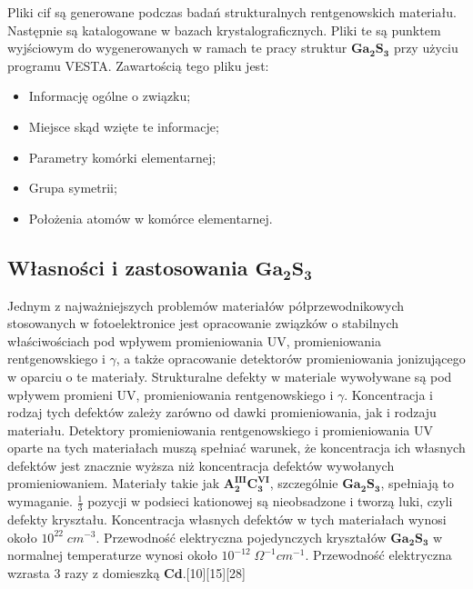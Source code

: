 Pliki cif są generowane podczas badań strukturalnych rentgenowskich materiału. Następnie są katalogowane w bazach krystalograficznych. Pliki te są punktem wyjściowym do wygenerowanych w ramach te pracy struktur $\mathbf{Ga_{2}S_{3}}$ przy użyciu programu VESTA. Zawartością tego pliku jest:
\begin{itemize}
	\item Informację ogólne o związku;
	\item Miejsce skąd wzięte te informacje;
	\item Parametry komórki elementarnej;
	\item Grupa symetrii;
	\item Położenia atomów w komórce elementarnej. 
\end{itemize} 

\subsection{Własności i zastosowania $\mathbf{Ga_{2}S_{3}}$}
Jednym z najważniejszych problemów materiałów półprzewodnikowych stosowanych w fotoelektronice jest opracowanie związków o stabilnych właściwościach pod wpływem promieniowania UV, promieniowania rentgenowskiego i $\gamma$, a także opracowanie detektorów promieniowania jonizującego w oparciu o te materiały. Strukturalne defekty w materiale wywoływane są pod wpływem promieni UV, promieniowania rentgenowskiego i $\gamma$. Koncentracja i rodzaj tych defektów zależy zarówno od dawki promieniowania, jak i rodzaju materiału. Detektory promieniowania rentgenowskiego i promieniowania UV oparte na tych materiałach muszą spełniać warunek, że koncentracja ich własnych defektów jest znacznie wyższa niż koncentracja defektów wywołanych promieniowaniem. Materiały takie jak $\mathbf{A_{2}^{III}C_{3}^{VI}}$, szczególnie $\mathbf{Ga_{2}S_{3}}$, spełniają to wymaganie. $\frac{1}{3}$ pozycji w podsieci kationowej są nieobsadzone i tworzą luki, czyli defekty kryształu. Koncentracja własnych defektów w tych materiałach wynosi około $10^{22}\;cm^{-3}$. Przewodność elektryczna pojedynczych kryształów $\mathbf{Ga_{2}S_{3}}$ w normalnej temperaturze wynosi około $10^{-12}\;\Omega^{-1}cm^{-1}$. Przewodność elektryczna wzrasta 3 razy z domieszką $\mathbf{Cd}$.[10][15][28]
